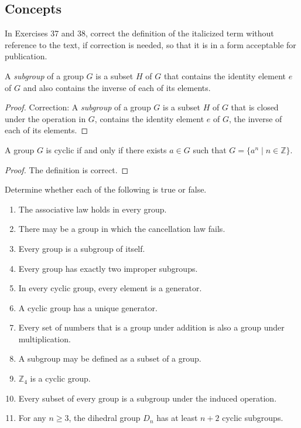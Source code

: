 \subsection*{Concepts}

In Exercises 37 and 38, correct the definition of the italicized term without reference to the text, if correction is needed, so that it is in a form acceptable for publication.

\begin{exercise}
    A \textit{subgroup} of a group $G$ is a subset $H$ of $G$ that contains the identity element $e$ of $G$ and also contains the inverse of each of its elements.
\end{exercise}

\begin{proof}
    Correction: A \textit{subgroup} of a group $G$ is a subset $H$ of $G$ that is closed under the operation in $G$, contains the identity element $e$ of $G$, the inverse of each of its elements.
\end{proof}

\begin{exercise}
    A group $G$ is cyclic if and only if there exists $a\in G$ such that $G = \{ a^{n} \mid n\in\mathbb{Z} \}$.
\end{exercise}

\begin{proof}
    The definition is correct.
\end{proof}

\begin{exercise}
    Determine whether each of the following is true or false.
    \begin{enumerate}[label={\textbf{\alph*}}]
        \item The associative law holds in every group.
        \item There may be a group in which the cancellation law fails.
        \item Every group is a subgroup of itself.
        \item Every group has exactly two improper subgroups.
        \item In every cyclic group, every element is a generator.
        \item A cyclic group has a unique generator.
        \item Every set of numbers that is a group under addition is also a group under multiplication.
        \item A subgroup may be defined as a subset of a group.
        \item $\mathbb{Z}_{4}$ is a cyclic group.
        \item Every subset of every group is a subgroup under the induced operation.
        \item For any $n \geq 3$, the dihedral group $D_{n}$ has at least $n + 2$ cyclic subgroups.
    \end{enumerate}
\end{exercise}

